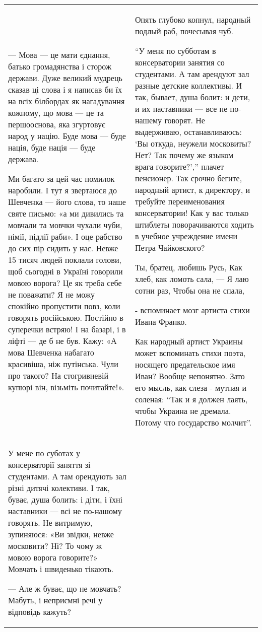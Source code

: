 \begin{longtable}{|p{}|p{}|}
— Мова — це мати єднання, батько громадянства і сторож держави. Дуже великий
мудрець сказав ці слова і я написав би їх на всіх білбордах як нагадування
кожному, що мова — це та першооснова, яка згуртовує народ у націю. Буде мова —
буде нація, буде нація — буде держава.

Ми багато за цей час помилок наробили. І тут я звертаюся до Шевченка — його
слова, то наше святе письмо: «а ми дивились та мовчали та мовчки чухали чуби,
німії, підлії раби». І оце рабство до сих пір сидить у нас. Невже 15 тисяч
людей поклали голови, щоб сьогодні в Україні говорили мовою ворога? Це як треба
себе не поважати? Я не можу спокійно пропустити повз, коли говорять російською.
Постійно в суперечки встряю! І на базарі, і в ліфті — де б не був. Кажу: «А
мова Шевченка набагато красивіша, ніж путінська. Чули про такого? На
стогривневій купюрі він, візьміть почитайте!».

& 

Опять глубоко копнул, народный подлый раб, почесывая чуб.

\enquote{У меня по субботам в консерватории занятия со студентами. А там арендуют зал
разные детские коллективы. И так, бывает, душа болит: и дети, и их наставники —
все не по-нашему говорят. Не выдерживаю, останавливаюсь: \enquote{Вы откуда, неужели
московиты? Нет? Так почему же языком врага говорите?},} плачет пенсионер. Так
срочно бегите, народный артист, к директору, и требуйте переименования
консерватории! Как у вас только штиблеты поворачиваются ходить в учебное
учреждение имени Петра Чайковского?

Ты, братец, любишь Русь,
Как хлеб, как ломоть сала, —
Я лаю сотни раз,
Чтобы она не спала, 

- вспоминает мозг артиста стихи Ивана Франко. 

Как народный артист Украины может вспоминать стихи поэта, носящего
предательское имя Иван? Вообще непонятно. Зато его мысль, как слеза - мутная и
соленая: \enquote{Так и я должен лаять, чтобы Украина не дремала. Потому что
государство молчит}.

\\

У мене по суботах у консерваторії заняття зі студентами. А там орендують зал
різні дитячі колективи. І так, буває, душа болить: і діти, і їхні наставники —
всі не по-нашому говорять. Не витримую, зупиняюся: «Ви звідки, невже московити?
Ні? То чому ж мовою ворога говорите?» Мовчать і швиденько тікають.

— Але ж буває, що не мовчать? Мабуть, і неприємні речі у відповідь кажуть?


\end{longtable}
